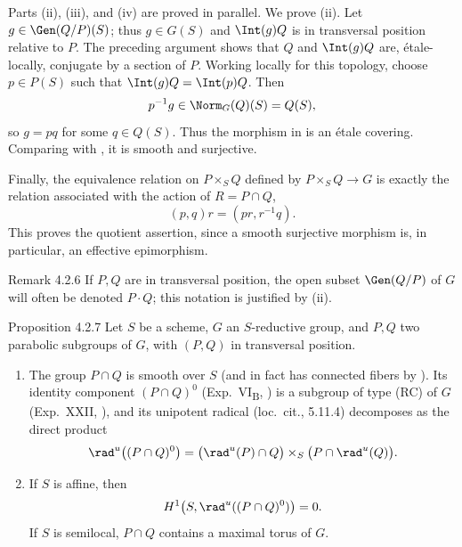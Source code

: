 Parts \textup{(ii)}, \textup{(iii)}, and \textup{(iv)} are proved in
parallel.  We prove \textup{(ii)}.  Let \(g\in\Gen(Q/P)(S)\); thus
\(g\in G(S)\) and \(\Int(g)Q\) is in transversal position relative to
\(P\).  The preceding argument shows that \(Q\) and \(\Int(g)Q\) are,
étale-locally, conjugate by a section of \(P\).  Working locally for
this topology, choose \(p\in P(S)\) such that
\(\Int(g)Q=\Int(p)Q\).  Then
\[
 p^{-1}g\in\Norm_G(Q)(S)=Q(S),
\]
so \(g=pq\) for some \(q\in Q(S)\).  Thus the morphism in
\textup{} is an étale covering.  Comparing with
\textup{}, it is smooth and surjective.

Finally, the equivalence relation on \(P\times_SQ\) defined by
\(P\times_SQ\to G\) is exactly the relation associated with the action
of \(R=P\cap Q\),
\[
 (p,q)r=(pr,r^{-1}q).
\]
This proves the quotient assertion, since a smooth surjective morphism
is, in particular, an effective epimorphism.
\SGAQED

\begin{sgastatement}{Remark 4.2.6}
If \(P,Q\) are in transversal position, the open subset \(\Gen(Q/P)\)
of \(G\) will often be denoted \(P\cdot Q\); this notation is justified
by \textup{(ii)}.
\end{sgastatement}

\begin{sgastatement}{Proposition 4.2.7}
Let \(S\) be a scheme, \(G\) an \(S\)-reductive group, and \(P,Q\) two
parabolic subgroups of \(G\), with \((P,Q)\) in transversal position.
\begin{enumerate}[label=\textup{(\roman*)}]
\item The group \(P\cap Q\) is smooth over \(S\) (and in fact has
connected fibers by ).  Its identity component
\((P\cap Q)^0\) \textup{(Exp.\ VI\textsubscript{B}, )} is a
subgroup of type \textup{(RC)} of \(G\)
\textup{(Exp.\ XXII, )}, and its unipotent radical
\textup{(loc.\ cit., 5.11.4)} decomposes as the direct product
\[
 \rad^u\bigl((P\cap Q)^0\bigr)
 =
 \bigl(\rad^u(P)\cap Q\bigr)
 \times_S
 \bigl(P\cap\rad^u(Q)\bigr).
\]
\item If \(S\) is affine, then
\[
 H^1\bigl(S,\rad^u((P\cap Q)^0)\bigr)=0.
\]
If \(S\) is semilocal, \(P\cap Q\) contains a maximal torus of \(G\).
\end{enumerate}
\end{sgastatement}

